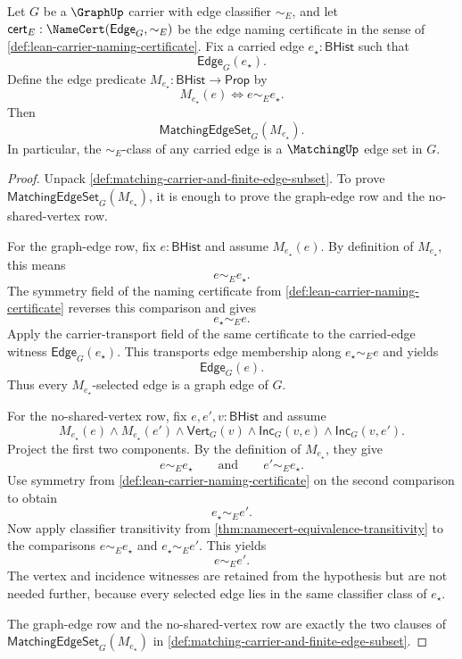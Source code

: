 \begin{theorem}
\label{thm:singleton-edge-predicate-is-matching}
Let $G$ be a $\GraphUp$ carrier with edge classifier $\sim_E$, and let $\mathsf{cert}_E:\NameCert(\mathsf{Edge}_G,\sim_E)$ be the edge naming certificate in the sense of \autoref{def:lean-carrier-naming-certificate}. Fix a carried edge $e_\star:\mathsf{BHist}$ such that
$$
\mathsf{Edge}_G(e_\star).
$$
Define the edge predicate $M_{e_\star}:\mathsf{BHist}\to\mathsf{Prop}$ by
$$
M_{e_\star}(e)\Longleftrightarrow e\sim_E e_\star.
$$
Then
$$
\mathsf{MatchingEdgeSet}_G(M_{e_\star}).
$$
In particular, the $\sim_E$-class of any carried edge is a $\MatchingUp$ edge set in $G$.
\end{theorem}
\begin{proof}
Unpack \autoref{def:matching-carrier-and-finite-edge-subset}. To prove
$\mathsf{MatchingEdgeSet}_G(M_{e_\star})$, it is enough to prove the graph-edge row and the no-shared-vertex row.

For the graph-edge row, fix $e:\mathsf{BHist}$ and assume $M_{e_\star}(e)$. By definition of $M_{e_\star}$, this means
$$
e\sim_E e_\star.
$$
The symmetry field of the naming certificate from \autoref{def:lean-carrier-naming-certificate} reverses this comparison and gives
$$
e_\star\sim_E e.
$$
Apply the carrier-transport field of the same certificate to the carried-edge witness $\mathsf{Edge}_G(e_\star)$. This transports edge membership along $e_\star\sim_E e$ and yields
$$
\mathsf{Edge}_G(e).
$$
Thus every $M_{e_\star}$-selected edge is a graph edge of $G$.

For the no-shared-vertex row, fix $e,e',v:\mathsf{BHist}$ and assume
$$
M_{e_\star}(e)\land M_{e_\star}(e')\land\mathsf{Vert}_G(v)\land\mathsf{Inc}_G(v,e)\land\mathsf{Inc}_G(v,e').
$$
Project the first two components. By the definition of $M_{e_\star}$, they give
$$
e\sim_E e_\star
\qquad\text{and}\qquad
e'\sim_E e_\star.
$$
Use symmetry from \autoref{def:lean-carrier-naming-certificate} on the second comparison to obtain
$$
e_\star\sim_E e'.
$$
Now apply classifier transitivity from \autoref{thm:namecert-equivalence-transitivity} to the comparisons $e\sim_E e_\star$ and $e_\star\sim_E e'$. This yields
$$
e\sim_E e'.
$$
The vertex and incidence witnesses are retained from the hypothesis but are not needed further, because every selected edge lies in the same classifier class of $e_\star$.

The graph-edge row and the no-shared-vertex row are exactly the two clauses of $\mathsf{MatchingEdgeSet}_G(M_{e_\star})$ in \autoref{def:matching-carrier-and-finite-edge-subset}.
\end{proof}

